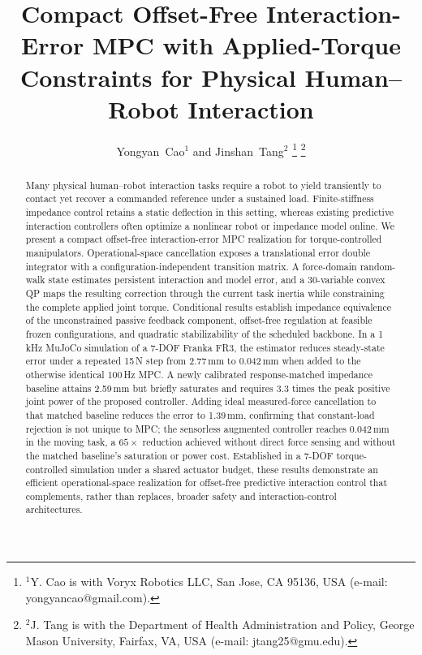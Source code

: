 \documentclass[journal]{IEEEtran}
\begin{document}
\title{Compact Offset-Free Interaction-Error MPC with Applied-Torque Constraints for Physical Human--Robot Interaction}

\author{Yongyan~Cao$^{1}$ and Jinshan~Tang$^{2}$%
\thanks{$^{1}$Y. Cao is with Voryx Robotics LLC, San Jose, CA 95136, USA
(e-mail: yongyancao@gmail.com).}%
\thanks{$^{2}$J. Tang is with the Department of Health Administration and
Policy, George Mason University, Fairfax, VA, USA
(e-mail: jtang25@gmu.edu).}}

\maketitle

\begin{abstract}
Many physical human--robot interaction tasks require a robot to yield
transiently to contact yet recover a commanded reference under a sustained
load.  Finite-stiffness impedance control retains a static deflection in this
setting, whereas existing predictive interaction controllers often optimize a
nonlinear robot or impedance model online.  We present a compact offset-free
interaction-error MPC realization for torque-controlled manipulators.
Operational-space cancellation exposes a translational error double
integrator with a configuration-independent transition matrix.  A
force-domain random-walk state estimates persistent interaction and model
error, and a 30-variable convex QP maps the resulting correction through the
current task inertia while constraining the complete applied joint torque.
Conditional results establish impedance equivalence of the unconstrained
passive feedback component, offset-free regulation at feasible frozen
configurations, and quadratic stabilizability of the scheduled backbone.
In a 1\,kHz MuJoCo simulation of a 7-DOF Franka FR3, the estimator reduces
steady-state error under a repeated 15\,N step from 2.77\,mm to 0.042\,mm when
added to the otherwise identical 100\,Hz MPC.  A newly calibrated
response-matched impedance baseline attains 2.59\,mm but briefly saturates and
requires 3.3 times the peak positive joint power of the proposed controller.
Adding ideal measured-force cancellation to that matched baseline reduces the
error to 1.39\,mm, confirming that constant-load rejection is not unique to MPC;
the sensorless augmented controller reaches 0.042\,mm in the moving task, a
$65\times$ reduction achieved without direct force sensing and without the
matched baseline's saturation or power cost. Established in a 7-DOF
torque-controlled simulation under a shared actuator budget, these results
demonstrate an efficient operational-space realization for offset-free
predictive interaction control that complements, rather than replaces,
broader safety and interaction-control architectures.
\end{abstract}
\end{document}
